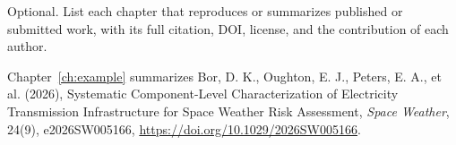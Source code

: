 {\raggedright\setlength{\parskip}{11pt}
Optional. List each chapter that reproduces or summarizes published or submitted work, with its full citation, DOI, license, and the contribution of each author.

Chapter~\ref{ch:example} summarizes Bor, D. K., Oughton, E. J., Peters, E. A., et al. (2026), Systematic Component-Level Characterization of Electricity Transmission Infrastructure for Space Weather Risk Assessment, \textit{Space Weather}, 24(9), e2026SW005166, \url{https://doi.org/10.1029/2026SW005166}.\par}
